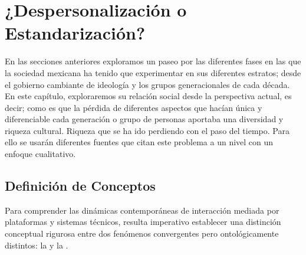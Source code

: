 \section{¿Despersonalización o Estandarización?}
\label{sec:despersonalizacion-estandarizacion}

En las secciones anteriores exploramos un paseo por las diferentes fases en las que la sociedad mexicana
ha tenido que experimentar en sus diferentes estratos; desde el gobierno cambiante de ideología y los grupos
generacionales de cada década. En este capítulo, exploraremos su relación social desde la perspectiva actual,
es decir; como es que la pérdida de diferentes aspectos que hacían única y diferenciable cada generación o grupo
de personas aportaba una diversidad y riqueza cultural. Riqueza que se ha ido perdiendo con el paso del tiempo.
Para ello se usarán diferentes fuentes que citan este problema a un nivel  con un
enfoque cualitativo.

\subsection{Definición de Conceptos}
\label{ssec:definicion-conceptos}

Para comprender las dinámicas contemporáneas de interacción mediada por plataformas y sistemas técnicos,
resulta imperativo establecer una distinción conceptual rigurosa entre dos fenómenos convergentes
pero ontológicamente distintos: la  y la .


